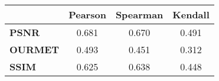 \begin{tabular}{|l|c|c|c|}
\hline
&\textbf{Pearson}&\textbf{Spearman}&\textbf{Kendall}\\\hline
\textbf{PSNR}&0.681&0.670&0.491\\\hline
\textbf{OURMET}&0.493&0.451&0.312\\\hline
\textbf{SSIM}&0.625&0.638&0.448\\\hline
\end{tabular}
